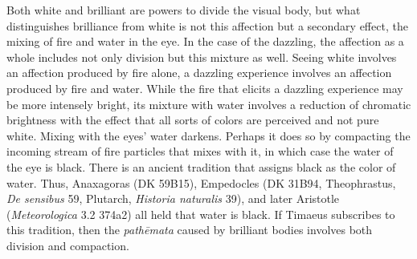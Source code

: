 Both white and brilliant are powers to divide the visual body, but what distinguishes brilliance from white is not this affection but a secondary effect, the mixing of fire and water in the eye. In the case of the dazzling, the affection as a whole includes not only division but this mixture as well. Seeing white involves an affection produced by fire alone, a dazzling experience involves an affection produced by fire and water. While the fire that elicits a dazzling experience may be more intensely bright, its mixture with water involves a reduction of chromatic brightness with the effect that all sorts of colors are perceived and not pure white. Mixing with the eyes' water darkens. Perhaps it does so by compacting the incoming stream of fire particles that mixes with it, in which case the water of the eye is black. There is an ancient tradition that assigns black as the color of water. Thus, Anaxagoras (DK 59B15), Empedocles (DK 31B94, Theophrastus, \emph{De sensibus} 59, Plutarch, \emph{Historia naturalis} 39), and later Aristotle (\emph{Meteorologica} 3.2 374a2) all held that water is black. If Timaeus subscribes to this tradition, then the \emph{pathēmata} caused by brilliant bodies involves both division and compaction.


